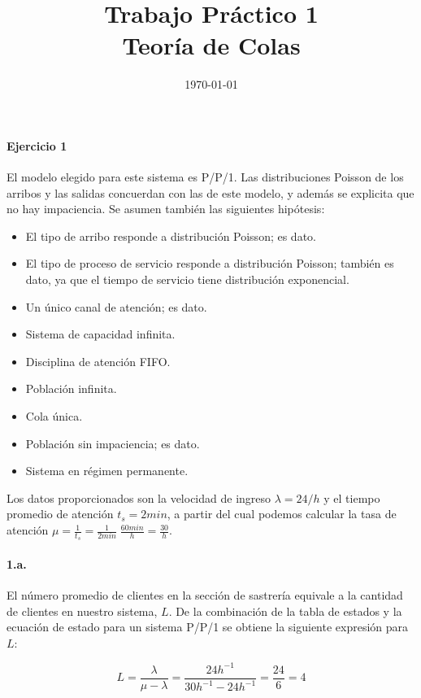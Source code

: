 \documentclass{article}
\title{Trabajo Práctico 1\\Teoría de Colas}
\author{}
\date{\today}
\begin{document}
\maketitle

\paragraph{Ejercicio 1}
    El modelo elegido para este sistema es P/P/1. Las distribuciones Poisson de los arribos y las salidas concuerdan con las de este modelo, y además se explicita que no hay impaciencia. Se asumen también las siguientes hipótesis:
    \begin{itemize}
        \item El tipo de arribo responde a distribución Poisson; es dato.
        \item El tipo de proceso de servicio responde a distribución Poisson; también es dato, ya que el tiempo de servicio tiene distribución exponencial. 
        \item Un único canal de atención; es dato.
        \item Sistema de capacidad infinita.
        \item Disciplina de atención FIFO.
        \item Población infinita.
        \item Cola única.
        \item Población sin impaciencia; es dato.
        \item Sistema en régimen permanente.
    \end{itemize}
    
    Los datos proporcionados son la velocidad de ingreso $ \lambda = 24/h $ y el tiempo promedio de atención $ t_s = 2 min $, a partir del cual podemos calcular la tasa de atención $ \mu = \frac{1}{t_s} = \frac{1}{2min} \; \frac{60min}{h} = \frac{30}{h} $.

    \paragraph{1.a.} El número promedio de clientes en la sección de sastrería equivale a la cantidad de clientes en nuestro sistema, $ L $. De la combinación de la tabla de estados y la ecuación de estado para un sistema P/P/1 se obtiene la siguiente expresión para $ L $:

    $$ L = \frac{\lambda}{\mu - \lambda} = \frac{24 h^{-1}}{30 h^{-1} - 24 h^{-1}} = \frac{24}{6} = 4 $$
\end{document}
